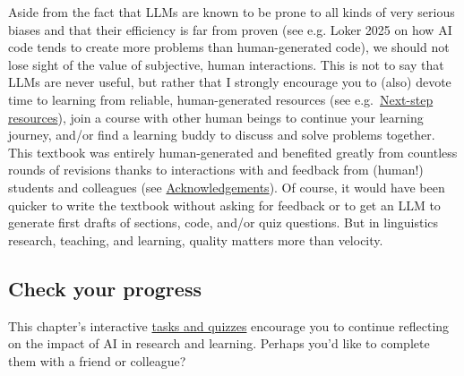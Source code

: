 \documentclass[
  letterpaper,
  DIV=11,
  numbers=noendperiod]{scrreprt}
\begin{document}
Aside from the fact that LLMs are known to be prone to all kinds of very
serious biases and that their efficiency is far from proven (see e.g.
Loker 2025 on how AI code tends to create more problems than
human-generated code), we should not lose sight of the value of
subjective, human interactions. This is not to say that LLMs are never
useful, but rather that I strongly encourage you to (also) devote time
to learning from reliable, human-generated resources (see
e.g.~\href{https://elenlefoll.github.io/RstatsTextbook/A_FurtherResources.html}{Next-step
resources}), join a course with other human beings to continue your
learning journey, and/or find a learning buddy to discuss and solve
problems together. This textbook was entirely human-generated and
benefited greatly from countless rounds of revisions thanks to
interactions with and feedback from (human!) students and colleagues
(see
\href{https://elenlefoll.github.io/RstatsTextbook/\#acknowledgements}{Acknowledgements}).
Of course, it would have been quicker to write the textbook without
asking for feedback or to get an LLM to generate first drafts of
sections, code, and/or quiz questions. But in linguistics research,
teaching, and learning, quality matters more than velocity.

\subsection*{Check your progress}\label{check-your-progress-29}

This chapter's interactive
\href{https://elenlefoll.github.io/RstatsTextbook/quizzes/15_quiz.html}{tasks
and quizzes} encourage you to continue reflecting on the impact of AI in
research and learning. Perhaps you'd like to complete them with a friend
or colleague?~
\end{document}
